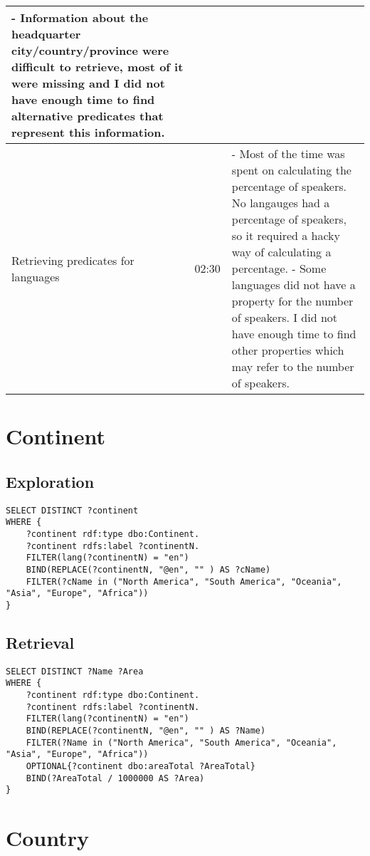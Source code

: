 \documentclass[11pt]{article}
\begin{document}
\begin{longtable}{|p{3.9cm}|p{4.05cm}|p{6.8cm}|}
        - Information about the headquarter city/country/province were difficult to retrieve, most of it were missing and I did not have enough time to find alternative predicates that represent this information.
    \\
    \hline
    Retrieving predicates for languages & 02:30 & 
        - Most of the time was spent on calculating the percentage of speakers. No langauges had a percentage of speakers, so it required a hacky way of calculating a percentage. \newline
        - Some languages did not have a property for the number of speakers. I did not have enough time to find other properties which may refer to the number of speakers.
    \\
    \hline
\end{longtable}

\section{Continent}

\subsection{Exploration}

{\footnotesize\begin{verbatim}
SELECT DISTINCT ?continent
WHERE {
    ?continent rdf:type dbo:Continent.
    ?continent rdfs:label ?continentN.
    FILTER(lang(?continentN) = "en")
    BIND(REPLACE(?continentN, "@en", "" ) AS ?cName)
    FILTER(?cName in ("North America", "South America", "Oceania", "Asia", "Europe", "Africa"))
}
\end{verbatim}}

\subsection{Retrieval}

{\footnotesize\begin{verbatim}
SELECT DISTINCT ?Name ?Area
WHERE {
    ?continent rdf:type dbo:Continent.
    ?continent rdfs:label ?continentN.
    FILTER(lang(?continentN) = "en")
    BIND(REPLACE(?continentN, "@en", "" ) AS ?Name)
    FILTER(?Name in ("North America", "South America", "Oceania", "Asia", "Europe", "Africa"))
    OPTIONAL{?continent dbo:areaTotal ?AreaTotal}
    BIND(?AreaTotal / 1000000 AS ?Area)
}
\end{verbatim}}


\section{Country}
\end{document}
